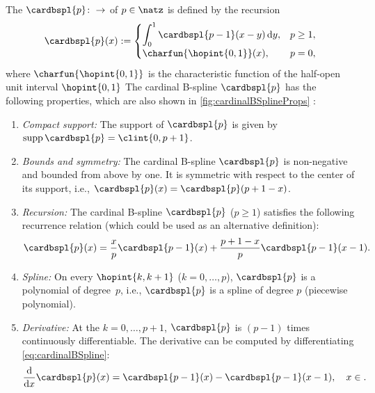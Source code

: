 The 
$\cardbspl{p}\colon \real \to \real$ of  $p \in \natz$
is defined by the recursion
\begin{equation}
  \label{eq:cardinalBSpline}
  \cardbspl{p}(x)
  :=
  \begin{cases}
    \displaystyle\int_0^1 \cardbspl{p-1}(x - y) \diff{}y,&p \ge 1,\\
    \charfun{\hopint{0, 1}}(x),&p = 0,
  \end{cases}
\end{equation}
where $\charfun{\hopint{0, 1}}$ is the characteristic function of
the half-open unit interval $\hopint{0, 1}$
\cite{Hoellig13Approximation}
The cardinal B-spline $\cardbspl{p}$ has the following properties,
which are also shown in \cref{fig:cardinalBSplineProps}
\cite{Hoellig03Finite}:
\begin{enumerate}
  \item
  \emph{Compact support:}
  The support of $\cardbspl{p}$ is given by $\supp \cardbspl{p} = \clint{0, p + 1}$.
  
  \item
  \emph{Bounds and symmetry:}
  The cardinal B-spline $\cardbspl{p}$ is non-negative and bounded from above by one.
  It is symmetric with respect to the center of its support, i.e.,
  $\cardbspl{p}(x) = \cardbspl{p}(p + 1 - x)$.
  
  \item
  \emph{Recursion:}
  The cardinal B-spline $\cardbspl{p}$ ($p \ge 1$) satisfies the following recurrence
  relation
  (which could be used as an alternative definition):
  \begin{equation}
    \cardbspl{p}(x)
    = \frac{x}{p} \cardbspl{p-1}(x) + \frac{p+1-x}{p} \cardbspl{p-1}(x-1).
  \end{equation}
  
  \item
  \emph{Spline:}
  On every  $\hopint{k, k+1}$
  ($k = 0, \dotsc, p$), $\cardbspl{p}$ is a polynomial of degree~$p$, i.e.,
  $\cardbspl{p}$ is a spline of degree $p$ (piecewise polynomial).
  
  \item
  \emph{Derivative:}
  At the  $k = 0, \dotsc, p + 1$,
  $\cardbspl{p}$ is $(p - 1)$ times continuously differentiable.
  The derivative can be computed by differentiating
  \eqref{eq:cardinalBSpline}:
  \begin{equation}
    \label{eq:cardinalBSplineDerivative}
    \frac{\diff}{\dx} \cardbspl{p}(x)
    = \cardbspl{p-1}(x) - \cardbspl{p-1}(x-1),\quad
    x \in \real.
  \end{equation}
  

\end{enumerate}
